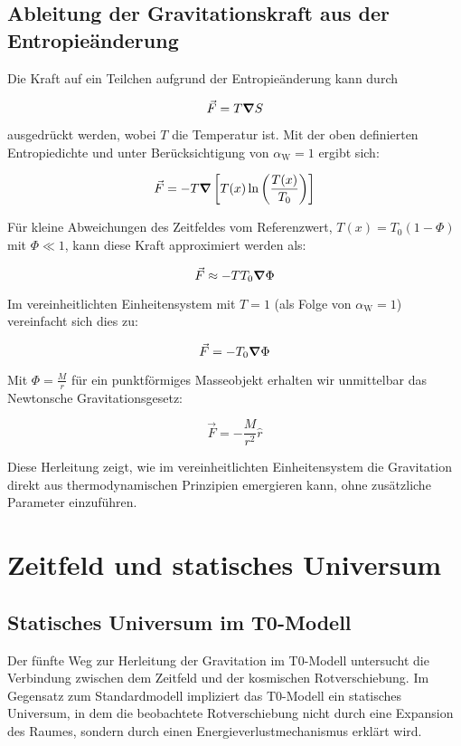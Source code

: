 \documentclass[12pt,a4paper]{article}
\newcommand{\Tfield}{T(x)}
\newcommand{\Tzero}{T_0}
\newcommand{\alphaW}{\alpha_{\text{W}}}
\begin{document}
	\subsection{Ableitung der Gravitationskraft aus der Entropieänderung}
	Die Kraft auf ein Teilchen aufgrund der Entropieänderung kann durch
	
	\begin{equation}
		\vec{F} = T \grad S
	\end{equation}
	
	ausgedrückt werden, wobei \(T\) die Temperatur ist. Mit der oben definierten Entropiedichte und unter Berücksichtigung von \(\alphaW = 1\) ergibt sich:
	
	\begin{equation}
		\vec{F} = -T \grad\left[\Tfield \ln\left(\frac{\Tfield}{\Tzero}\right)\right]
	\end{equation}
	
	Für kleine Abweichungen des Zeitfeldes vom Referenzwert, \(\Tfield = \Tzero(1 - \Phi)\) mit \(\Phi \ll 1\), kann diese Kraft approximiert werden als:
	
	\begin{equation}
		\vec{F} \approx -T \Tzero \grad \Phi
	\end{equation}
	
	Im vereinheitlichten Einheitensystem mit \(T = 1\) (als Folge von \(\alphaW = 1\)) vereinfacht sich dies zu:
	
	\begin{equation}
		\vec{F} = -\Tzero \grad \Phi
	\end{equation}
	
	Mit \(\Phi = \frac{M}{r}\) für ein punktförmiges Masseobjekt erhalten wir unmittelbar das Newtonsche Gravitationsgesetz:
	
	\begin{equation}
		\vec{F} = -\frac{M}{r^2} \hat{r}
	\end{equation}
	
	Diese Herleitung zeigt, wie im vereinheitlichten Einheitensystem die Gravitation direkt aus thermodynamischen Prinzipien emergieren kann, ohne zusätzliche Parameter einzuführen.
	
	\section{Zeitfeld und statisches Universum}
	
	\subsection{Statisches Universum im T0-Modell}
	Der fünfte Weg zur Herleitung der Gravitation im T0-Modell untersucht die Verbindung zwischen dem Zeitfeld und der kosmischen Rotverschiebung. Im Gegensatz zum Standardmodell impliziert das T0-Modell ein statisches Universum, in dem die beobachtete Rotverschiebung nicht durch eine Expansion des Raumes, sondern durch einen Energieverlustmechanismus erklärt wird.
	
\end{document}
